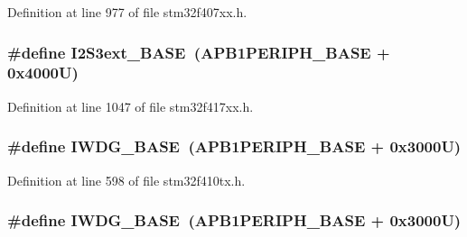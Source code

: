Definition at line 977 of file stm32f407xx.\+h.

\subsubsection[{\texorpdfstring{I2\+S3ext\+\_\+\+B\+A\+SE}{I2S3ext_BASE}}]{\setlength{\rightskip}{0pt plus 5cm}\#define I2\+S3ext\+\_\+\+B\+A\+SE~({\bf A\+P\+B1\+P\+E\+R\+I\+P\+H\+\_\+\+B\+A\+SE} + 0x4000\+U)}\hypertarget{group___peripheral__registers__structures_ga89b61d6e6b09e94f3fccb7bef34e0263}{}\label{group___peripheral__registers__structures_ga89b61d6e6b09e94f3fccb7bef34e0263}


Definition at line 1047 of file stm32f417xx.\+h.

\subsubsection[{\texorpdfstring{I\+W\+D\+G\+\_\+\+B\+A\+SE}{IWDG_BASE}}]{\setlength{\rightskip}{0pt plus 5cm}\#define I\+W\+D\+G\+\_\+\+B\+A\+SE~({\bf A\+P\+B1\+P\+E\+R\+I\+P\+H\+\_\+\+B\+A\+SE} + 0x3000\+U)}\hypertarget{group___peripheral__registers__structures_ga8543ee4997296af5536b007cd4748f55}{}\label{group___peripheral__registers__structures_ga8543ee4997296af5536b007cd4748f55}


Definition at line 598 of file stm32f410tx.\+h.

\subsubsection[{\texorpdfstring{I\+W\+D\+G\+\_\+\+B\+A\+SE}{IWDG_BASE}}]{\setlength{\rightskip}{0pt plus 5cm}\#define I\+W\+D\+G\+\_\+\+B\+A\+SE~({\bf A\+P\+B1\+P\+E\+R\+I\+P\+H\+\_\+\+B\+A\+SE} + 0x3000\+U)}\hypertarget{group___peripheral__registers__structures_ga8543ee4997296af5536b007cd4748f55}{}\label{group___peripheral__registers__structures_ga8543ee4997296af5536b007cd4748f55}


